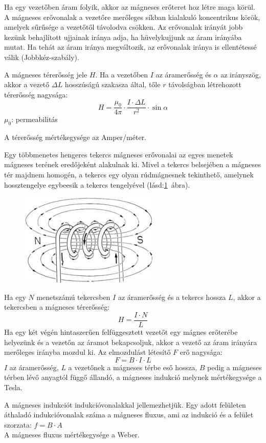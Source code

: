 Ha egy vezetőben áram folyik, akkor az mágneses erőteret hoz létre maga körül. A mágneses erővonalak a vezetőre merőleges síkban kialakuló koncentrikus körök, amelyek sűrűsége a vezetőtől távolodva csökken. Az erővonalak irányát jobb kezünk behajlított ujjainak iránya adja, ha hüvelykujjunk az áram irányába mutat. Ha tehát az áram iránya megváltozik, az erővonalak iránya is ellentétessé válik (Jobbkéz-szabály).
\begin{theorem}
A mágneses térerősség jele $H$. Ha a vezetőben $I$ az áramerősség és $\alpha$ az irányszög, akkor a vezető $\Delta L$ hosszúságú szakasza által, tőle $r$ távolságban létrehozott térerősség nagysága:
$$H=\frac{\mu_0}{4\pi}\cdot\frac{I\cdot \Delta L}{r^2}\cdot \sin \alpha$$
$\mu_0$: permeabilitás
\end{theorem}
A térerősség mértékegysége az Amper/méter.

Egy többmenetes hengeres tekercs mágneses erővonalai az egyes menetek mágneses terének eredőjeként alakulnak ki. Mivel a tekercs belsejében a mágneses tér majdnem homogén, a tekercs egy olyan rúdmágnesnek tekinthető, amelynek hossztengelye egybeesik a tekercs tengelyével (lásd:\ref{fig:9-coil}~ábra).
\begin{figure}[h]
	\centering
	\includegraphics[width=0.3\linewidth]{fig/9-Coil}
	\caption{}
	\label{fig:9-coil}
\end{figure}
Ha egy $N$ menetszámú tekercsben $I$ az áramerősség és a tekercs hossza $L$, akkor a tekercsben a mágneses térerősség:
$$H = \frac{I\cdot N}{L}$$
Ha egy két végén hintaszerűen felfüggesztett vezetőt egy mágnes erőterébe helyezünk és a vezetőn az áramot bekapcsoljuk, akkor a vezető az áram irányára merőleges irányba mozdul ki. Az elmozdulást létesítő $F$ erő nagysága:
$$ F = B \cdot I \cdot L $$
$I$ az áramerősség, $L$ a vezetőnek a mágneses térbe eső hossza, $B$ pedig a mágneses térben lévő anyagtól függő állandó, a mágneses indukció melynek mértékegysége a Tesla.

A mágneses indukciót indukcióvonalakkal jellemezhetjük. Egy adott felületen áthaladó indukcióvonalak száma a mágneses fluxus, ami az indukció és a felület szorzata: $f = B\cdot A$\\
A mágneses fluxus mértékegysége a Weber.

